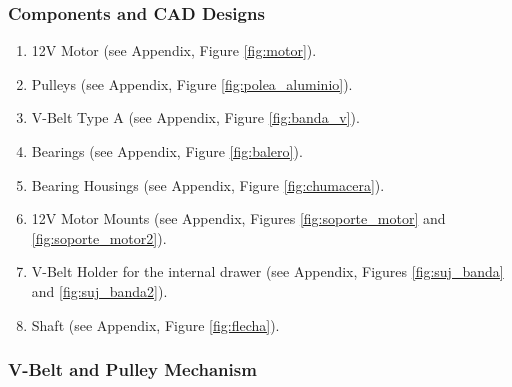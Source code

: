 \subsubsection{Components and CAD Designs}
    \begin{enumerate}
        \item 12V Motor (see Appendix, Figure \ref{fig:motor}).
            
        \item Pulleys (see Appendix, Figure \ref{fig:polea_aluminio}).
    
        \item V-Belt Type A (see Appendix, Figure \ref{fig:banda_v}).
        
        \item Bearings (see Appendix, Figure \ref{fig:balero}).

        \item Bearing Housings (see Appendix, Figure \ref{fig:chumacera}).
        
        \item 12V Motor Mounts (see Appendix, Figures \ref{fig:soporte_motor} and \ref{fig:soporte_motor2}).
        
        \item V-Belt Holder for the internal drawer (see Appendix, Figures \ref{fig:suj_banda} and \ref{fig:suj_banda2}).
        
        \item Shaft (see Appendix, Figure \ref{fig:flecha}).
            
    \end{enumerate}

\subsubsection{V-Belt and Pulley Mechanism}

